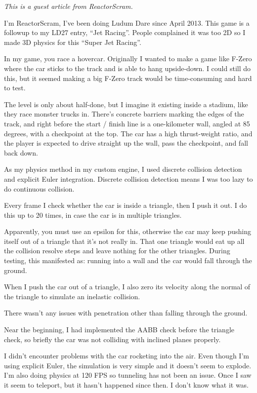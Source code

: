 \documentclass[]{book}
\begin{document}
\emph{This is a guest article from ReactorScram.}

I'm ReactorScram, I've been doing Ludum Dare since April 2013. This game
is a followup to my LD27 entry, ``Jet Racing''. People complained it was
too 2D so I made 3D physics for this ``Super Jet Racing''.

In my game, you race a hovercar. Originally I wanted to make a game like
F-Zero where the car sticks to the track and is able to hang
upside-down. I could still do this, but it seemed making a big F-Zero
track would be time-consuming and hard to test.

The level is only about half-done, but I imagine it existing inside a
stadium, like they race monster trucks in. There's concrete barriers
marking the edges of the track, and right before the start / finish line
is a one-kilometer wall, angled at 85 degrees, with a checkpoint at the
top. The car has a high thrust-weight ratio, and the player is expected
to drive straight up the wall, pass the checkpoint, and fall back down.

As my physics method in my custom engine, I used discrete collision
detection and explicit Euler integration. Discrete collision detection
means I was too lazy to do continuous collision.

Every frame I check whether the car is inside a triangle, then I push it
out. I do this up to 20 times, in case the car is in multiple triangles.

Apparently, you must use an epsilon for this, otherwise the car may keep
pushing itself out of a triangle that it's not really in. That one
triangle would eat up all the collision resolve steps and leave nothing
for the other triangles. During testing, this manifested as: running
into a wall and the car would fall through the ground.

When I push the car out of a triangle, I also zero its velocity along
the normal of the triangle to simulate an inelastic collision.

There wasn't any issues with penetration other than falling through the
ground.

Near the beginning, I had implemented the AABB check before the triangle
check, so briefly the car was not colliding with inclined planes
properly.

I didn't encounter problems with the car rocketing into the air. Even
though I'm using explicit Euler, the simulation is very simple and it
doesn't seem to explode. I'm also doing physics at 120 FPS so tunneling
has not been an issue. Once I saw it seem to teleport, but it hasn't
happened since then. I don't know what it was.
\end{document}
